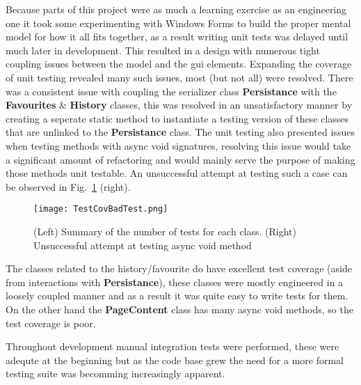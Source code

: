 \documentclass[../Main.tex]{subfiles}
\begin{document}
Because parts of this project were as much a learning exercise as an engineering one it took some experimenting with Windows Forms to build the proper mental model for how it all fits together, as a result writing unit tests was delayed until much later in development. This resulted in a design with numerous tight coupling issues between the model and the gui elements. 
Expanding the coverage of unit testing revealed many such issues, most (but not all) were resolved. 
There was a consistent issue with coupling the serializer class \textbf{Persistance} with the \textbf{Favourites} \& \textbf{History} classes, this was resolved in an unsatisfactory manner by creating a seperate static method to instantiate a testing version of these classes that are unlinked to the \textbf{Persistance} class.
The unit testing also presented issues when testing methods with async void signatures, resolving this issue would take a significant amount of refactoring and would mainly serve the purpose of making those methods unit testable. An unsuccessful attempt at testing such a case can be observed in Fig.~\ref{fig:TestCov} (right).

\begin{figure}[H]
    \begin{center}
        \texttt{[image: TestCovBadTest.png]}
    \end{center}
    \caption{(Left) Summary of the number of tests for each class. (Right) Unsuccessful attempt at testing async void method}
    \label{fig:TestCov}
\end{figure}

The classes related to the history/favourite do have excellent test coverage (aside from interactions with \textbf{Persistance}), these classes were mostly engineered in a loosely coupled manner and as a result it was quite easy to write tests for them. On the other hand the \textbf{PageContent} class has many async void methods, so the test coverage is poor.

Throughout development manual integration tests were performed, these were adequte at the beginning but as the code base grew the need for a more formal testing suite was becomming increasingly apparent.
\end{document}
